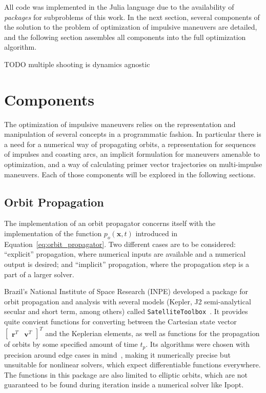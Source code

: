 
All code was implemented in the Julia language due to the availability of \textit{packages} for subproblems of this work. In the next section, several components of the solution to the problem of optimization of impulsive maneuvers are detailed, and the following section assembles all components into the full optimization algorithm.

TODO multiple shooting is dynamics agnostic

\section{Components}

The optimization of impulsive maneuvers relies on the representation and manipulation of several concepts in a programmatic fashion. In particular there is a need for a numerical way of propagating orbits, a representation for sequences of impulses and coasting arcs, an implicit formulation for maneuvers amenable to optimization, and a way of calculating primer vector trajectories on multi-impulse maneuvers. Each of those components will be explored in the following sections.

\subsection{Orbit Propagation}\label{sec:orbit_propagation}

The implementation of an orbit propagator concerns itself with the implementation of the function \(p_o(\mathbf{x}, t)\) introduced in Equation~\eqref{eq:orbit_propagator}. Two different cases are to be considered: ``explicit'' propagation, where numerical inputs are available and a numerical output is desired; and ``implicit'' propagation, where the propagation step is a part of a larger solver.

Brazil's National Institute of Space Research (INPE) developed a package for orbit propagation and analysis with several models (Kepler, J2 semi-analytical secular and short term, among others) called \texttt{SatelliteToolbox}~\cite{satellitetoolbox}. It provides quite convient functions for converting between the Cartesian state vector \(\begin{bmatrix}
    \mathbf{r}^T & \mathbf{v}^T
\end{bmatrix}^T\) and the Keplerian elements, as well as functions for the propagation of orbits by some specified amount of time \(t_p\). Its algorithms were chosen with precision around edge cases in mind~\cite{rv_to_kepler}, making it numerically precise but unsuitable for nonlinear solvers, which expect differentiable functions everywhere. The functions in this package are also limited to elliptic orbits, which are not guaranteed to be found during iteration inside a numerical solver like Ipopt.

